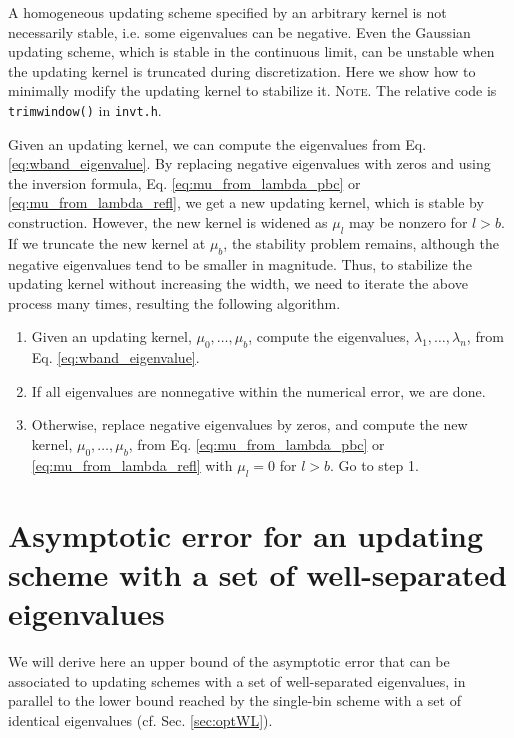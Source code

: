 \documentclass[reprint, superscriptaddress, floatfix]{revtex4-1}
\newcommand{\note}[1]{{\color{DarkGreen}\footnotesize \textsc{Note.} #1}}
\begin{document}
%
A homogeneous updating scheme
specified by an arbitrary kernel
is not necessarily stable,
i.e. some eigenvalues can be negative.
%
%
Even
the Gaussian updating scheme, which is stable in the continuous limit,
can be unstable
when the updating kernel is truncated during discretization.
%
Here we show how to minimally modify
the updating kernel
to stabilize it.
%
\note{The relative code is \texttt{trimwindow()} in \texttt{invt.h}.
}


Given an updating kernel,
we can compute the eigenvalues from
Eq. \eqref{eq:wband_eigenvalue}.
%
By replacing negative eigenvalues with zeros and
using the inversion formula,
Eq. \eqref{eq:mu_from_lambda_pbc}
or \eqref{eq:mu_from_lambda_refl},
we get a new updating kernel,
which is stable by construction.
%
However, the new kernel is widened
as $\mu_l$ may be nonzero for $l > b$.
%
If we truncate the new kernel at $\mu_b$,
the stability problem remains,
although the negative eigenvalues
tend to be smaller in magnitude.
%
Thus, to stabilize the updating kernel
without increasing the width,
we need to iterate the above process many times,
resulting the following algorithm.


%
\begin{enumerate}
  \item
    Given an updating kernel, $\mu_0, \dots, \mu_b$,
    compute the eigenvalues,
    $\lambda_1, \dots, \lambda_n$,
    from Eq. \eqref{eq:wband_eigenvalue}.
  \item
    If all eigenvalues are nonnegative within the numerical error,
    we are done. %
  \item
    Otherwise, replace negative eigenvalues by zeros,
    and compute the new kernel,
    $\mu_0, \dots, \mu_b$, from
    Eq. \eqref{eq:mu_from_lambda_pbc}
    or
    \eqref{eq:mu_from_lambda_refl}
    with $\mu_l = 0$ for $l > b$.
    Go to step 1.
\end{enumerate}


\section{\label{sec:upperbound}
Asymptotic error for an updating scheme
with a set of well-separated eigenvalues}


We will derive here an upper bound of the asymptotic error
that can be associated to updating schemes
with a set of well-separated eigenvalues,
in parallel to the lower bound reached by
the single-bin scheme with a set of identical eigenvalues
(cf. Sec. \ref{sec:optWL}).
\end{document}
